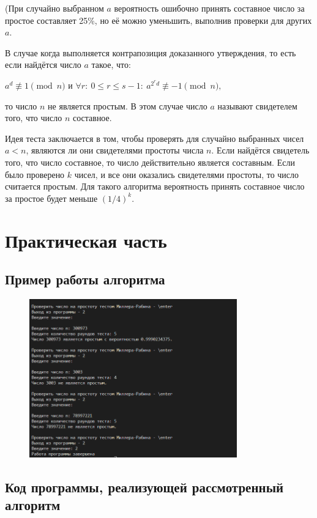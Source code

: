 \documentclass[bachelor, och, labwork]{shiza}
\begin{document}
(При случайно выбранном $a$ вероятность ошибочно принять составное число за 
простое составляет 25\%, но её можно уменьшить, выполнив проверки для других $a$.

В случае когда выполняется контрапозиция доказанного утверждения, то есть 
если найдётся число $a$ такое, что:

\begin{center}
    $a^{d} \not\equiv 1\pmod{n}$ и $\forall r:\ 0\le r\le s-1:\ a^{2^rd} \not\equiv -1\pmod{n},$
\end{center}

то число $n$ не является простым. В этом случае число $a$ называют свидетелем того, 
что число $n$ составное.

Идея теста заключается в том, чтобы проверять для случайно выбранных 
чисел $a<n$, являются ли они свидетелями простоты числа $n$. Если найдётся 
свидетель того, что число составное, то число действительно является составным. 
Если было проверено $k$ чисел, и все они оказались свидетелями простоты, то число 
считается простым. Для такого алгоритма вероятность принять составное число за 
простое будет меньше $(1/4)^{k}$.


\section{Практическая часть}
\subsection{Пример работы алгоритма}
\begin{figure}[H]
    \centering
    \includegraphics[width=0.8\textwidth]{pic1.png}
    \caption{}
\end{figure}

    \subsection{Код программы, реализующей рассмотренный алгоритм}
        \inputminted{python}{lab7.py}
\end{document}
